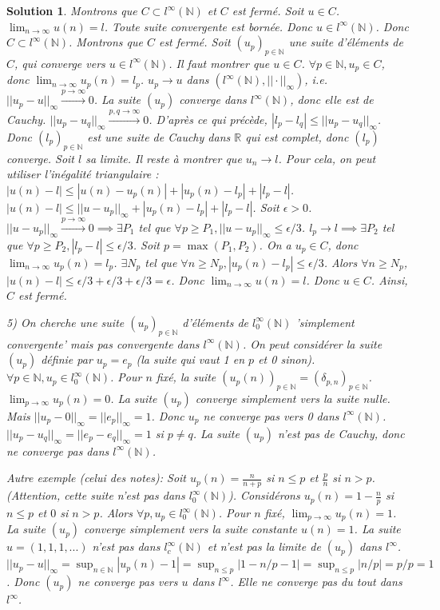 \documentclass{article}
\newtheorem{solution}{Solution}
\begin{document}
\begin{solution}
Montrons que $C \subset l^\infty(\mathbb{N})$ et $C$ est fermé.
Soit $u \in C$. $\lim_{n \to \infty} u(n) = l$. Toute suite convergente est bornée. Donc $u \in l^\infty(\mathbb{N})$. Donc $C \subset l^\infty(\mathbb{N})$.
Montrons que $C$ est fermé.
Soit $(u_p)_{p \in \mathbb{N}}$ une suite d'éléments de $C$, qui converge vers $u \in l^\infty(\mathbb{N})$.
Il faut montrer que $u \in C$.
$\forall p \in \mathbb{N}, u_p \in C$, donc $\lim_{n \to \infty} u_p(n) = l_p$.
$u_p \to u$ dans $(l^\infty(\mathbb{N}), ||\cdot||_\infty)$, i.e. $||u_p - u||_\infty \xrightarrow{p \to \infty} 0$.
La suite $(u_p)$ converge dans $l^\infty(\mathbb{N})$, donc elle est de Cauchy.
$||u_p - u_q||_\infty \xrightarrow{p,q \to \infty} 0$.
D'après ce qui précède, $|l_p - l_q| \le ||u_p - u_q||_\infty$.
Donc $(l_p)_{p \in \mathbb{N}}$ est une suite de Cauchy dans $\mathbb{R}$ qui est complet, donc $(l_p)$ converge. Soit $l$ sa limite.
Il reste à montrer que $u_n \to l$.
Pour cela, on peut utiliser l'inégalité triangulaire :
$|u(n) - l| \le |u(n) - u_p(n)| + |u_p(n) - l_p| + |l_p - l|$.
$|u(n) - l| \le ||u - u_p||_\infty + |u_p(n) - l_p| + |l_p - l|$.
Soit $\epsilon > 0$.
$||u - u_p||_\infty \xrightarrow{p \to \infty} 0 \implies \exists P_1$ tel que $\forall p \ge P_1, ||u - u_p||_\infty \le \epsilon/3$.
$l_p \to l \implies \exists P_2$ tel que $\forall p \ge P_2, |l_p - l| \le \epsilon/3$.
Soit $p = \max(P_1, P_2)$.
On a $u_p \in C$, donc $\lim_{n \to \infty} u_p(n) = l_p$.
$\exists N_p$ tel que $\forall n \ge N_p, |u_p(n) - l_p| \le \epsilon/3$.
Alors $\forall n \ge N_p$, $|u(n) - l| \le \epsilon/3 + \epsilon/3 + \epsilon/3 = \epsilon$.
Donc $\lim_{n \to \infty} u(n) = l$.
Donc $u \in C$.
Ainsi, $C$ est fermé.

5) On cherche une suite $(u_p)_{p \in \mathbb{N}}$ d'éléments de $l_0^\infty(\mathbb{N})$ 'simplement convergente' mais pas convergente dans $l^\infty(\mathbb{N})$.
On peut considérer la suite $(u_p)$ définie par $u_p = e_p$ (la suite qui vaut 1 en $p$ et 0 sinon).
$\forall p \in \mathbb{N}, u_p \in l_0^\infty(\mathbb{N})$.
Pour $n$ fixé, la suite $(u_p(n))_{p \in \mathbb{N}} = (\delta_{p,n})_{p \in \mathbb{N}}$.
$\lim_{p \to \infty} u_p(n) = 0$. La suite $(u_p)$ converge simplement vers la suite nulle.
Mais $||u_p - 0||_\infty = ||e_p||_\infty = 1$. Donc $u_p$ ne converge pas vers 0 dans $l^\infty(\mathbb{N})$.
$||u_p - u_q||_\infty = ||e_p - e_q||_\infty = 1$ si $p \ne q$. La suite $(u_p)$ n'est pas de Cauchy, donc ne converge pas dans $l^\infty(\mathbb{N})$.

Autre exemple (celui des notes):
Soit $u_p(n) = \frac{n}{n+p}$ si $n \le p$ et $\frac{p}{n}$ si $n > p$. (Attention, cette suite n'est pas dans $l_0^\infty(\mathbb{N})$).
Considérons $u_p(n) = 1 - \frac{n}{p}$ si $n \le p$ et $0$ si $n > p$.
Alors $\forall p, u_p \in l_0^\infty(\mathbb{N})$.
Pour $n$ fixé, $\lim_{p \to \infty} u_p(n) = 1$. La suite $(u_p)$ converge simplement vers la suite constante $u(n)=1$.
La suite $u=(1,1,1,...)$ n'est pas dans $l_c^\infty(\mathbb{N})$ et n'est pas la limite de $(u_p)$ dans $l^\infty$.
$||u_p - u||_\infty = \sup_{n \in \mathbb{N}} |u_p(n) - 1| = \sup_{n \le p} |1 - n/p - 1| = \sup_{n \le p} |n/p| = p/p = 1$.
Donc $(u_p)$ ne converge pas vers $u$ dans $l^\infty$. Elle ne converge pas du tout dans $l^\infty$.


\end{solution}
\end{document}
